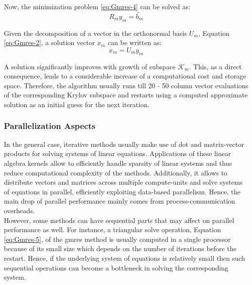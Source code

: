 Now, the minimization problem \ref{eq:Gmres-4} can be solved as:\\

\begin{equation} \label{eq:Gmres-5}
	R_m y_{m} = \tilde{b_m}
\end{equation}

Given the decomposition of a vector in  the orthonormal basis $U_{m}$, Equation \ref{eq:Gmres-2}, a solution vector $x_{m}$ can be written as:\\

\begin{equation} \label{eq:Gmres-6}
	x_m = U_m y_{m}  
\end{equation}


A solution significantly improves with growth of subspace $\mathcal{K}_{m}$. This, as a direct consequence, leads to a considerable increase of a computational cost and storage space. Therefore, the algorithm usually runs till 20 - 50 column vector evaluations of the corresponding Krylov subspace and restarts using a computed approximate solution as an initial guess for the next iteration.\\


\subsubsection{Parallelization Aspects}
\label{subseq:iterative-parallel-aspects}


In the general case, iterative methods usually make use of dot and matrix-vector products for solving systems of linear equations. Applications of these linear algebra kernels allow to efficiently handle sparsity of linear systems and thus reduce computational complexity of the methods. Additionally, it allows to distribute vectors and matrices across multiple compute-units and solve systems of equations in parallel, efficiently exploiting data-based parallelism. Hence, the main drop of parallel performance mainly comes from process-communication overheads.\\


However, some methods can have sequential parts that may affect on parallel performance as well. For instance, a triangular solve operation,  Equation \ref{eq:Gmres-5}, of the \acrshort{gmres} method is usually computed in a single processor because of its small size which depends on the number of iterations before the restart. Hence, if the underlying system of equations is relatively small then such sequential operations can become a bottleneck in solving the corresponding system.\\


